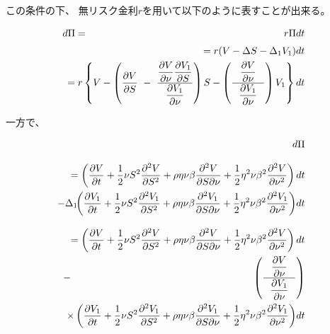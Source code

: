 \documentclass[uplatex,a4j,12pt,dvipdfmx]{jsarticle}
\begin{document}
この条件の下、
無リスク金利$r$を用いて以下のように表すことが出来る。


\begin{eqnarray*}
	d \Pi
	&=&
	r \Pi dt
	\\[1mm] &&
	\hspace{-10mm}
	= r (V - \Delta S - \Delta_{1} V_{1}) dt
	\\ &&
	\hspace{-10mm}
	= r \left\{
	V -
	\left(
	\dfrac{\partial V}{\partial S}
	\ - \
	\dfrac{
		\dfrac{\partial V}{\partial \nu}
		\dfrac{\partial V_{1}}{\partial S}
	}{
		\dfrac{\partial V_{1}}{\partial \nu}
	}
	\right)
	S
	-
	\left(
	\dfrac{ \
		\dfrac{\partial V}{\partial \nu}
		\
	}{ \ \
		\dfrac{\partial V_{1}}{\partial \nu}
		\ \
	}
	\right)
	V_{1}
	\right\} dt
\end{eqnarray*}


一方で、


\begin{eqnarray*}
	&&
	\hspace{-5mm}
	d \Pi
	\\[3mm] &&
	\hspace{-10mm}
	=
	\left(
	\dfrac{\partial V}{\partial t}
	+
	\dfrac{1}{2}
	\nu S^{2}
	\dfrac{\partial^{2} V}{\partial S^{2}}
	+
	\rho \eta \nu \beta
	\dfrac{\partial^{2} V}{\partial S \partial \nu}
	+
	\dfrac{1}{2}
	\eta^{2} \nu \beta^{2}
	\dfrac{\partial^{2} V}{\partial \nu^{2}}
	\right)dt
	\\ && \hspace{-10mm} -
	\Delta_{1}
	\!\!
	\left(
	\dfrac{\partial V_{1}}{\partial t}
	+
	\dfrac{1}{2}
	\nu S^{2}
	\dfrac{\partial^{2} V_{1}}{\partial S^{2}}
	+
	\rho \eta \nu \beta
	\dfrac{\partial^{2} V_{1}}{\partial S \partial \nu}
	+
	\dfrac{1}{2}
	\eta^{2} \nu \beta^{2}
	\dfrac{\partial^{2} V_{1}}{\partial \nu^{2}}
	\right)
	\!
	dt
	\\[3mm] &&
	\hspace{-10mm}
	=
	\left(
	\dfrac{\partial V}{\partial t}
	+
	\dfrac{1}{2}
	\nu S^{2}
	\dfrac{\partial^{2} V}{\partial S^{2}}
	+
	\rho \eta \nu \beta
	\dfrac{\partial^{2} V}{\partial S \partial \nu}
	+
	\dfrac{1}{2}
	\eta^{2} \nu \beta^{2}
	\dfrac{\partial^{2} V}{\partial \nu^{2}}
	\right)dt
	\\ &-&
	\!\!\!\!
	\left(
	\dfrac{ \
		\dfrac{\partial V}{\partial \nu}
		\
	}{ \ \
		\dfrac{\partial V_{1}}{\partial \nu}
		\ \
	}
	\right)
	\\ &&
	\hspace{-5mm}
	\times
	\left(
	\dfrac{\partial V_{1}}{\partial t}
	+
	\dfrac{1}{2}
	\nu S^{2}
	\dfrac{\partial^{2} V_{1}}{\partial S^{2}}
	+
	\rho \eta \nu \beta
	\dfrac{\partial^{2} V_{1}}{\partial S \partial \nu}
	+
	\dfrac{1}{2}
	\eta^{2} \nu \beta^{2}
	\dfrac{\partial^{2} V_{1}}{\partial \nu^{2}}
	\right)
	\!
	dt
\end{eqnarray*}
\end{document}
